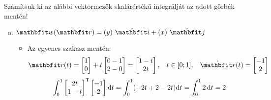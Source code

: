 \documentclass[exercise]{math-standalone}
\begin{document}
\begin{exercise}{Számítsuk ki az alábbi vektormezők skalárértékű integrálját az adott görbék mentén!}
{\begin{enumerate}[a)]
      \item $\rvec w(\rvec r) = \ijz{y}{x}$
            \begin{itemize}[i)]
              \item Az egyenes szakasz mentén:
                    \[
                      \rvec r(t) = \begin{bmatrix}
                        1 \\ 0
                      \end{bmatrix} + t \begin{bmatrix}
                        0 - 1 \\ 2 - 0
                      \end{bmatrix} = \begin{bmatrix}
                        1 - t \\ 2t
                      \end{bmatrix}
                      \text, \quad
                      t \in [0;1]
                      \text, \quad
                      \dot{\rvec r}(t) = \begin{bmatrix}
                        -1 \\ 2
                      \end{bmatrix}
                    \]
                    \[
                      \int_0^1 \begin{bmatrix}
                        2t \\ 1 - t
                      \end{bmatrix}^{\mathsf{T}}
                      \begin{bmatrix}
                        -1 \\ 2
                      \end{bmatrix}
                      \mathrm{d} t
                      = \int_0^1 (-2t + 2 - 2t) \mathrm{d} t
                      = \int_0^1 2 \, \mathrm{d} t
                      = 2
                    \]


\end{itemize}
\end{enumerate}}
\end{exercise}
\end{document}
